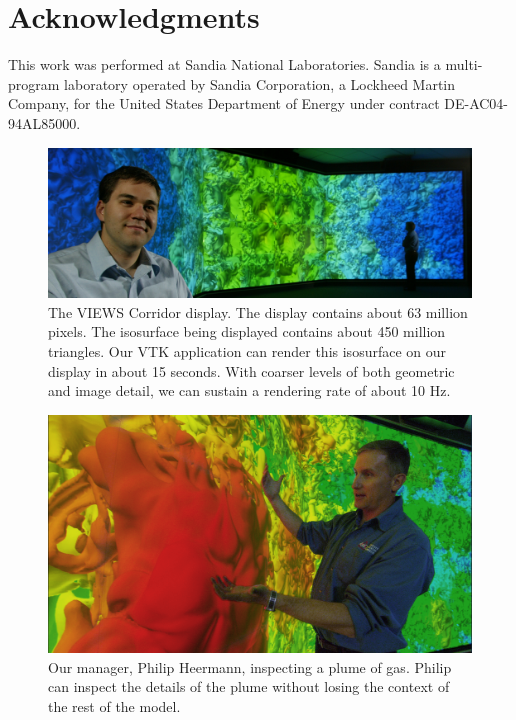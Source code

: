 \documentclass[twocolumn]{article}
\newcommand{\sticky}[1]{}
\begin{document}
  \section{Acknowledgments}

  This work was performed at Sandia National Laboratories.  Sandia is a
  multi-program laboratory operated by Sandia Corporation, a Lockheed
  Martin Company, for the United States Department of Energy under contract
  DE-AC04-94AL85000.


  
  

  \begin{figure}[!p]
    \includegraphics[width=\textwidth]{images/FullWall}
    \caption{The VIEWS Corridor display.  The display contains about 63
    million pixels.  The isosurface being displayed contains about 450
    million triangles.  Our VTK application can render this isosurface on
    our display in about 15 seconds.  With coarser levels of both geometric
    and image detail, we can sustain a rendering rate of about 10 Hz.
    \sticky{Might want to verify that.}}
    \label{fig:fullwall}
  \end{figure}

  \begin{figure}[!p]
    \includegraphics[width=\textwidth]{images/PhilwBlob}
    \caption{Our manager, Philip Heermann, inspecting a plume of gas.
    Philip can inspect the details of the plume without losing the context
    of the rest of the model.}
    \label{fig:philwblob}
  \end{figure}
\end{document}
